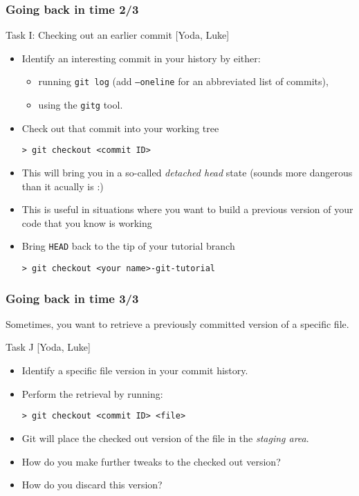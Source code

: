\begin{frame}[fragile]

\frametitle{Going back in time 2/3}

\begin{block}{Task I: Checking out an earlier commit [Yoda, Luke]}
	\begin{itemize}
	\item Identify an interesting commit in your history by either:
	\begin{itemize}
	\item running \texttt{git log} (add \texttt{--oneline} for an abbreviated list of commits),
	\item using the \texttt{gitg} tool. 
	\end{itemize}
	\item Check out that commit into your working tree
	\begin{verbatim}
> git checkout <commit ID>
	\end{verbatim}
	\item This will bring you in a so-called \emph{detached head} state (sounds more dangerous than it acually is :)
	\item This is useful in situations where you want to build a previous version of your code that you know is working
	\item Bring \texttt{HEAD} back to the tip of your tutorial branch
	\begin{verbatim}
> git checkout <your name>-git-tutorial
	\end{verbatim}
	\end{itemize}
\end{block}

\end{frame}


\begin{frame}[fragile]

\frametitle{Going back in time 3/3}

Sometimes, you want to retrieve a previously committed version of a specific file.

	\begin{block}{Task J [Yoda, Luke]}	
	\begin{itemize}	
	\item Identify a specific file version in your commit history.
	\item Perform the retrieval by running:
	\begin{verbatim}
> git checkout <commit ID> <file>
	\end{verbatim}
	\item Git will place the checked out version of the file in the \emph{staging area}.
	\item How do you make further tweaks to the checked out version?
	\item How do you discard this version?
	\end{itemize}	
	
	\end{block}
\end{frame}

